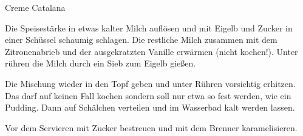 \begin{recipe}{Creme Catalana}{}
  \label{Creme Catalana}
  \inglist

  \steps
  
  Die Speisestärke in etwas kalter Milch auflösen und mit Eigelb und Zucker
  in einer Schüssel schaumig schlagen. Die restliche Milch zusammen mit dem
  Zitronenabrieb und der ausgekratzten Vanille erwärmen (nicht kochen!).
  Unter rühren die Milch durch ein Sieb zum Eigelb gießen.
  
  Die Mischung wieder in den Topf geben und unter Rühren vorsichtig erhitzen.
  Das darf auf keinen Fall kochen sondern soll nur etwa so fest werden, wie
  ein Pudding. Dann auf Schälchen verteilen und im Wasserbad kalt werden
  lassen.

  Vor dem Servieren mit Zucker bestreuen und mit dem Brenner
  karamelisieren.

\end{recipe}
